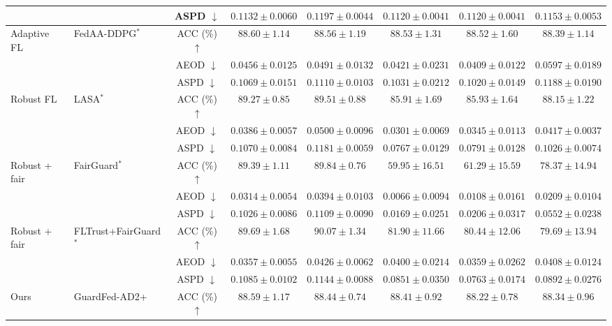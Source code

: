 \begin{table}[t]
{\begin{tabular}{l|l|c|ccccc}
 &  & ASPD $\downarrow$ & $0.1132 \pm 0.0060$ & $0.1197 \pm 0.0044$ & $0.1120 \pm 0.0041$ & $0.1120 \pm 0.0041$ & $0.1153 \pm 0.0053$ \\
\hline
\multirow{3}{*}{Adaptive FL} & \multirow{3}{*}{FedAA-DDPG$^{*}$} & ACC (\%) $\uparrow$ & $88.60 \pm 1.14$ & $88.56 \pm 1.19$ & $88.53 \pm 1.31$ & $88.52 \pm 1.60$ & $88.39 \pm 1.14$ \\
 &  & AEOD $\downarrow$ & $0.0456 \pm 0.0125$ & $0.0491 \pm 0.0132$ & $0.0421 \pm 0.0231$ & $0.0409 \pm 0.0122$ & $0.0597 \pm 0.0189$ \\
 &  & ASPD $\downarrow$ & $0.1069 \pm 0.0151$ & $0.1110 \pm 0.0103$ & $0.1031 \pm 0.0212$ & $0.1020 \pm 0.0149$ & $0.1188 \pm 0.0190$ \\
\hline
\multirow{3}{*}{Robust FL} & \multirow{3}{*}{LASA$^{*}$} & ACC (\%) $\uparrow$ & $89.27 \pm 0.85$ & $89.51 \pm 0.88$ & $85.91 \pm 1.69$ & $85.93 \pm 1.64$ & $88.15 \pm 1.22$ \\
 &  & AEOD $\downarrow$ & $0.0386 \pm 0.0057$ & $0.0500 \pm 0.0096$ & $0.0301 \pm 0.0069$ & $0.0345 \pm 0.0113$ & $0.0417 \pm 0.0037$ \\
 &  & ASPD $\downarrow$ & $0.1070 \pm 0.0084$ & $0.1181 \pm 0.0059$ & $0.0767 \pm 0.0129$ & $0.0791 \pm 0.0128$ & $0.1026 \pm 0.0074$ \\
\hline
\multirow{3}{*}{Robust + fair} & \multirow{3}{*}{FairGuard$^{*}$} & ACC (\%) $\uparrow$ & $89.39 \pm 1.11$ & $89.84 \pm 0.76$ & $59.95 \pm 16.51$ & $61.29 \pm 15.59$ & $78.37 \pm 14.94$ \\
 &  & AEOD $\downarrow$ & $0.0314 \pm 0.0054$ & $0.0394 \pm 0.0103$ & $0.0066 \pm 0.0094$ & $0.0108 \pm 0.0161$ & $0.0209 \pm 0.0104$ \\
 &  & ASPD $\downarrow$ & $0.1026 \pm 0.0086$ & $0.1109 \pm 0.0090$ & $0.0169 \pm 0.0251$ & $0.0206 \pm 0.0317$ & $0.0552 \pm 0.0238$ \\
\hline
\multirow{3}{*}{Robust + fair} & \multirow{3}{*}{FLTrust+FairGuard$^{*}$} & ACC (\%) $\uparrow$ & $89.69 \pm 1.68$ & $90.07 \pm 1.34$ & $81.90 \pm 11.66$ & $80.44 \pm 12.06$ & $79.69 \pm 13.94$ \\
 &  & AEOD $\downarrow$ & $0.0357 \pm 0.0055$ & $0.0426 \pm 0.0062$ & $0.0400 \pm 0.0214$ & $0.0359 \pm 0.0262$ & $0.0408 \pm 0.0124$ \\
 &  & ASPD $\downarrow$ & $0.1085 \pm 0.0102$ & $0.1144 \pm 0.0088$ & $0.0851 \pm 0.0350$ & $0.0763 \pm 0.0174$ & $0.0892 \pm 0.0276$ \\
\hline
\multirow{3}{*}{Ours} & \multirow{3}{*}{GuardFed-AD2+} & ACC (\%) $\uparrow$ & $88.59 \pm 1.17$ & $88.44 \pm 0.74$ & $88.41 \pm 0.92$ & $88.22 \pm 0.78$ & $88.34 \pm 0.96$ \\

\end{tabular}}
\end{table}
